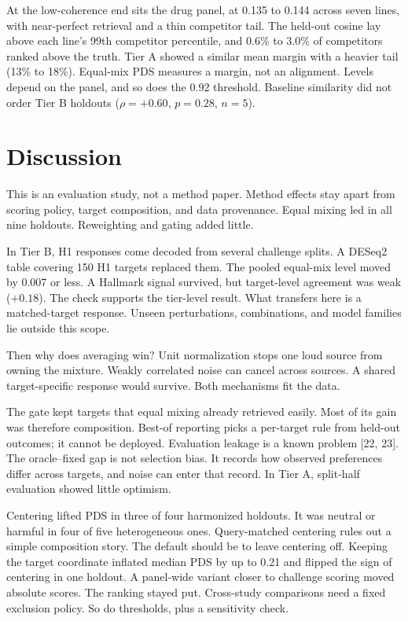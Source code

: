 \documentclass[12pt]{article}
\begin{document}
At the low-coherence end sits the drug panel, at 0.135 to 0.144 across seven lines, with near-perfect retrieval and a thin competitor tail. The held-out cosine lay above each line's 99th competitor percentile, and 0.6\% to 3.0\% of competitors ranked above the truth. Tier A showed a similar mean margin with a heavier tail (13\% to 18\%). Equal-mix PDS measures a margin, not an alignment. Levels depend on the panel, and so does the 0.92 threshold. Baseline similarity did not order Tier B holdouts ($\rho = +0.60$, $p = 0.28$, $n = 5$).

\section{Discussion}

This is an evaluation study, not a method paper. Method effects stay apart from scoring policy, target composition, and data provenance. Equal mixing led in all nine holdouts. Reweighting and gating added little.

In Tier B, H1 responses come decoded from several challenge splits. A DESeq2 table covering 150 H1 targets replaced them. The pooled equal-mix level moved by 0.007 or less. A Hallmark signal survived, but target-level agreement was weak ($+0.18$). The check supports the tier-level result. What transfers here is a matched-target response. Unseen perturbations, combinations, and model families lie outside this scope.

Then why does averaging win? Unit normalization stops one loud source from owning the mixture. Weakly correlated noise can cancel across sources. A shared target-specific response would survive. Both mechanisms fit the data.

The gate kept targets that equal mixing already retrieved easily. Most of its gain was therefore composition. Best-of reporting picks a per-target rule from held-out outcomes; it cannot be deployed. Evaluation leakage is a known problem [22, 23]. The oracle--fixed gap is not selection bias. It records how observed preferences differ across targets, and noise can enter that record. In Tier A, split-half evaluation showed little optimism.

Centering lifted PDS in three of four harmonized holdouts. It was neutral or harmful in four of five heterogeneous ones. Query-matched centering rules out a simple composition story. The default should be to leave centering off. Keeping the target coordinate inflated median PDS by up to 0.21 and flipped the sign of centering in one holdout. A panel-wide variant closer to challenge scoring moved absolute scores. The ranking stayed put. Cross-study comparisons need a fixed exclusion policy. So do thresholds, plus a sensitivity check.
\end{document}
